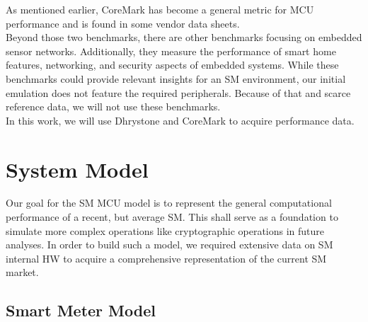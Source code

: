 \documentclass[english]{tudscrartcl}
\begin{document}
			As mentioned earlier, CoreMark has become a general metric for \ac{MCU} performance and is found in some vendor data sheets.
			\\
			Beyond those two benchmarks, there are other benchmarks \cite{8802949, CHEN2022100091, 8809492} focusing on embedded sensor networks.
			Additionally, they measure the performance of smart home features, networking, and security aspects of embedded systems.
			While these benchmarks could provide relevant insights for an \ac{SM} environment, our initial emulation does not feature the required peripherals.
			Because of that and scarce reference data, we will not use these benchmarks.
			\\
			In this work, we will use Dhrystone and CoreMark to acquire performance data.

	\section{System Model}
		\label{sec:sysmodel}
		Our goal for the \ac{SM} \ac{MCU} model is to represent the general computational performance of a recent, but average SM.
		This shall serve as a foundation to simulate more complex operations like cryptographic operations in future analyses.
		In order to build such a model, we required extensive data on \ac{SM} internal \ac{HW} to acquire a comprehensive representation of the current \ac{SM} market.
		\\
		\subsection{Smart Meter Model}
			\label{sec:sysmodel_sm}
\end{document}
